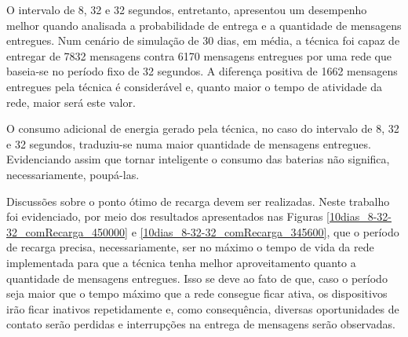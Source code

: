 O intervalo de 8, 32 e 32 segundos, entretanto, apresentou um desempenho melhor quando analisada a probabilidade de entrega e a quantidade de mensagens entregues. Num cenário de simulação de 30 dias, em média, a técnica foi capaz de entregar de 7832 mensagens contra 6170 mensagens entregues por uma rede que baseia-se no período fixo de 32 segundos. A diferença positiva de 1662 mensagens entregues pela técnica é considerável e, quanto maior o tempo de atividade da rede, maior será este valor.

O consumo adicional de energia gerado pela técnica, no caso do intervalo de 8, 32 e 32 segundos, traduziu-se numa maior quantidade de mensagens entregues. Evidenciando assim que tornar inteligente o consumo das baterias não significa, necessariamente, poupá-las.

Discussões sobre o ponto ótimo de recarga devem ser realizadas. Neste trabalho foi evidenciado, por meio dos resultados apresentados nas Figuras \ref{10dias_8-32-32_comRecarga_450000} e \ref{10dias_8-32-32_comRecarga_345600}, que o período de recarga precisa, necessariamente, ser no máximo o tempo de vida da rede implementada para que a técnica tenha melhor aproveitamento quanto a quantidade de mensagens entregues. Isso se deve ao fato de que, caso o período seja maior que o tempo máximo que a rede consegue ficar ativa, os dispositivos irão ficar inativos repetidamente e, como consequência, diversas oportunidades de contato serão perdidas e interrupções na entrega de mensagens serão observadas.
